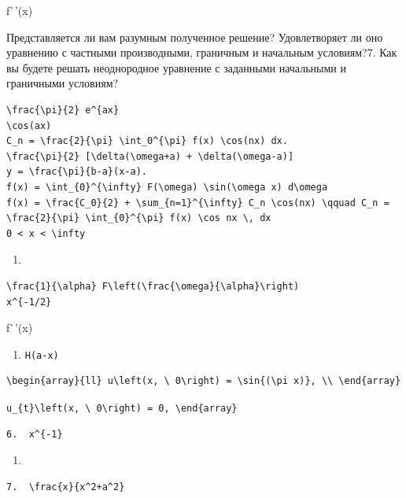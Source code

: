\documentclass[
  ukrainian,
]{article}
\providecommand{\tightlist}{%
  \setlength{\itemsep}{0pt}\setlength{\parskip}{0pt}}
\begin{document}
f'\,'(x)

Представляется ли вам разумным полученное решение? Удовлетворяет ли оно
уравнению с частными производными, граничным и начальным условиям?7. Как
вы будете решать неоднородное уравнение с заданными начальными и
граничными условиям?

\begin{verbatim}
\frac{\pi}{2} e^{ax}
\cos(ax)
C_n = \frac{2}{\pi} \int_0^{\pi} f(x) \cos(nx) dx.
\frac{\pi}{2} [\delta(\omega+a) + \delta(\omega-a)]
y = \frac{\pi}{b-a}(x-a).
f(x) = \int_{0}^{\infty} F(\omega) \sin(\omega x) d\omega
f(x) = \frac{C_0}{2} + \sum_{n=1}^{\infty} C_n \cos(nx) \qquad C_n = \frac{2}{\pi} \int_{0}^{\pi} f(x) \cos nx \, dx
0 < x < \infty
\end{verbatim}

\begin{enumerate}
\def\labelenumi{\arabic{enumi}.}
\tightlist
\item
\end{enumerate}

\begin{verbatim}
\frac{1}{\alpha} F\left(\frac{\omega}{\alpha}\right)
x^{-1/2}
\end{verbatim}

f'\,'(x)

\begin{enumerate}
\def\labelenumi{\arabic{enumi}.}
\setcounter{enumi}{4}
\tightlist
\item
  \texttt{H(a-x)}
\end{enumerate}

\begin{verbatim}
\begin{array}{ll} u\left(x, \ 0\right) = \sin{(\pi x)}, \\ \end{array}
\end{verbatim}

\texttt{u\_\{t\}\textbackslash{}left(x,\ \textbackslash{}\ 0\textbackslash{}right)\ =\ 0,\ \textbackslash{}end\{array\}}

\begin{verbatim}
6.  x^{-1}
\end{verbatim}

\begin{enumerate}
\def\labelenumi{\alph{enumi})}
\tightlist
\item
\end{enumerate}

\begin{verbatim}
7.  \frac{x}{x^2+a^2}
\end{verbatim}
\end{document}
